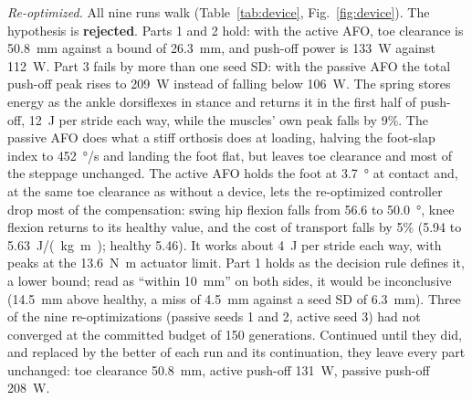 \emph{Re-optimized.} All nine runs walk (Table~\ref{tab:device}, Fig.~\ref{fig:device}). The hypothesis is \textbf{rejected}. Parts 1 and 2 hold: with the active AFO, toe clearance is \SI{50.8}{mm} against a bound of \SI{26.3}{mm}, and push-off power is \SI{133}{W} against \SI{112}{W}. Part 3 fails by more than one seed SD: with the passive AFO the total push-off peak rises to \SI{209}{W} instead of falling below \SI{106}{W}. The spring stores energy as the ankle dorsiflexes in stance and returns it in the first half of push-off, \SI{12}{J} per stride each way, while the muscles' own peak falls by 9\%. The passive AFO does what a stiff orthosis does at loading, halving the foot-slap index to \SI{452}{\degree/s} and landing the foot flat, but leaves toe clearance and most of the steppage unchanged. The active AFO holds the foot at \SI{+3.7}{\degree} at contact and, at the same toe clearance as without a device, lets the re-optimized controller drop most of the compensation: swing hip flexion falls from 56.6 to \SI{50.0}{\degree}, knee flexion returns to its healthy value, and the cost of transport falls by 5\% (5.94 to \SI{5.63}{J/(kg.m)}; healthy 5.46). It works about \SI{4}{J} per stride each way, with peaks at the \SI{13.6}{N.m} actuator limit. Part 1 holds as the decision rule defines it, a lower bound; read as ``within 10~mm'' on both sides, it would be inconclusive (14.5~mm above healthy, a miss of 4.5~mm against a seed SD of 6.3~mm). Three of the nine re-optimizations (passive seeds 1 and 2, active seed 3) had not converged at the committed budget of 150 generations. Continued until they did, and replaced by the better of each run and its continuation, they leave every part unchanged: toe clearance \SI{50.8}{mm}, active push-off \SI{131}{W}, passive push-off \SI{208}{W}.

